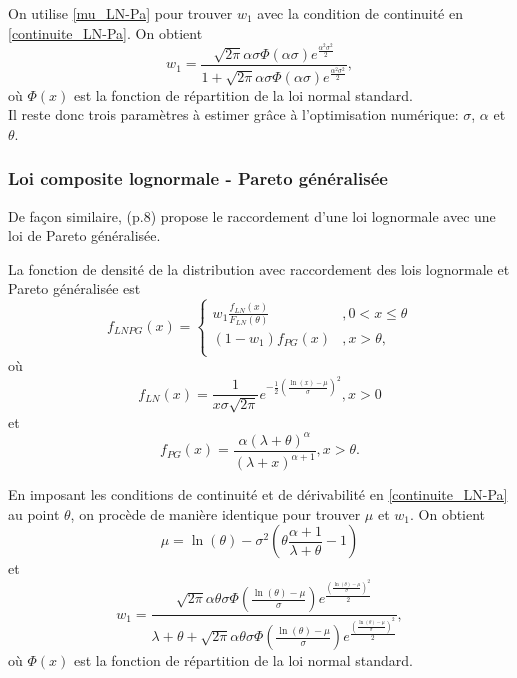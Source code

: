 		On utilise \ref{mu_LN-Pa} pour trouver $w_1$ avec la condition de continuité en \ref{continuite_LN-Pa}. On obtient
		$$w_1 = \frac{\sqrt{2 \pi} \alpha \sigma \Phi(\alpha \sigma) e^{\frac{\alpha ^2 \sigma ^2}{2}}}{1+\sqrt{2 \pi} \alpha \sigma \Phi(\alpha \sigma) e^{\frac{\alpha ^2 \sigma ^2}{2}}},$$
		où $\Phi(x)$ est la fonction de répartition de la loi normal standard. \\
		Il reste donc trois paramètres à estimer grâce à l'optimisation numérique: $\sigma$, $\alpha$ et $\theta$.
	
	\subsubsection{Loi composite lognormale - Pareto généralisée} 
	De façon similaire, \cite{brazauskas2016modeling} (p.8) propose le raccordement d'une loi lognormale avec une loi de Pareto généralisée.
	\begin{Definition}
		La fonction de densité de la distribution avec raccordement des lois lognormale et Pareto généralisée est
		$$
			f_{LNPG}(x) = \left\{
			\begin{array}{ll}
				w_1 \frac{f_{LN}(x)}{F_{LN}(\theta)} & ,0 < x \leq \theta \\
				(1-w_1) {f_{PG}(x)}& , x >\theta,  \\
			\end{array}
			\right.
		$$
		où $$f_{LN}(x)= \frac{1}{x \sigma \sqrt{2 \pi}} e^{-\frac{1}{2} \left( \frac{\ln(x)- \mu}{\sigma} \right)^2}, x>0$$ et $$f_{PG}(x)=\frac{\alpha (\lambda +\theta)^{\alpha}}{(\lambda + x)^{\alpha+1}}, x>\theta. $$
	\end{Definition}

	En imposant les conditions de continuité et de dérivabilité en \ref{continuite_LN-Pa} au point $\theta$, on procède de manière identique pour trouver $\mu$ et $w_1$. On obtient
	$$\mu = \ln (\theta) - \sigma^2 \left( \theta \frac{\alpha+1}{\lambda+\theta} - 1\right)$$
	et
	$$w_1 = \frac{\sqrt{2 \pi} \alpha \theta \sigma \Phi \left(\frac{\ln(\theta)- \mu}{\sigma} \right) e^{\frac{ \left( \frac{\ln(\theta) - \mu}{\sigma} \right)^2}{2}}}{\lambda + \theta +\sqrt{2 \pi} \alpha \theta \sigma \Phi \left(\frac{\ln(\theta)- \mu}{\sigma} \right) e^{\frac{ \left( \frac{\ln(\theta) - \mu}{\sigma} \right)^2}{2}}},$$
	où $\Phi(x)$ est la fonction de répartition de la loi normal standard. \\
	
